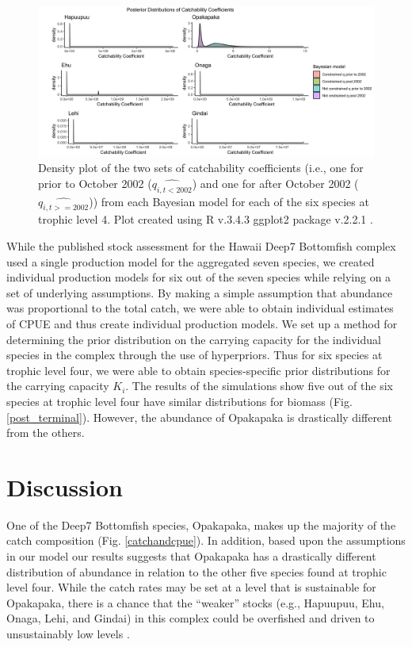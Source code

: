 \documentclass[oneside,12pt,final]{sty/ucthesis-CA2012}
\let\cite\citep                             %
\begin{document}
\begin{mainmatter}
\begin{figure}[H]
     \centering
       \includegraphics[width=\textwidth]{fig/post_catchability}
    \caption{Density plot of the two sets of catchability coefficients (i.e., one for prior to October 2002 ($\widehat{q_{i,t<2002}}$) and one for after October 2002 ($\widehat{q_{i,t>=2002}}$)) from each Bayesian model for each of the six species at trophic level 4. Plot created using R v.3.4.3 \cite{Rcite} ggplot2 package v.2.2.1 \cite{ggplot}.}
    \label{post_catchability}
\end{figure}

While the published stock assessment for the Hawaii Deep7 Bottomfish complex used a single production model for the aggregated seven species, we created individual production models for six out of the seven species while relying on a set of underlying assumptions. By making a simple assumption that abundance was proportional to the total catch, we were able to obtain individual estimates of CPUE and thus create individual production models. We set up a method for determining the prior distribution on the carrying capacity for the individual species in the complex through the use of hyperpriors. Thus for six species at trophic level four, we were able to obtain species-specific prior distributions for the carrying capacity $K_i$. The results of the simulations show five out of the six species at trophic level four have similar distributions for biomass (Fig. \ref{post_terminal}). However, the abundance of Opakapaka is drastically different from the others. 


\section{Discussion}
 One of the Deep7 Bottomfish species, Opakapaka, makes up the majority of the catch composition (Fig. \ref{catchandcpue}). In addition, based upon the assumptions in our model our results suggests that Opakapaka has a drastically different distribution of abundance in relation to the other five species found at trophic level four. While the catch rates may be set at a level that is sustainable for Opakapaka, there is a chance that the ``weaker” stocks (e.g., Hapuupuu, Ehu, Onaga, Lehi, and Gindai) in this complex could be overfished and driven to unsustainably low levels \cite{hastings2017marine}. 


\end{mainmatter}
\end{document}
